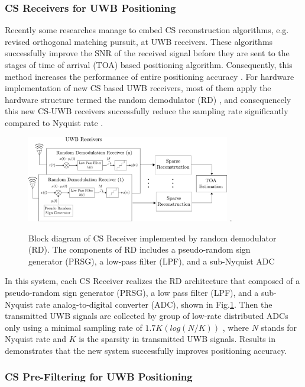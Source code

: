 \subsubsection{CS Receivers for UWB Positioning}

Recently some researches manage to embed CS reconstruction algorithms, e.g. revised orthogonal matching pursuit, at UWB receivers. These algorithms successfully improve the SNR of the received signal before they are sent to the stages of time of arrival (TOA) based positioning algorithm. Consequently, this method increases the performance of entire positioning accuracy \cite{banitalebi2014compressive}. For hardware implementation of new CS based UWB receivers, most of them apply the hardware structure termed the random demodulator (RD) \cite{kirolos2006analog}, and consequencely this new CS-UWB receivers successfully reduce the sampling rate significantly compared to Nyquist rate \cite{yang2011compressive}.

\begin{figure}[!t]
\centering
\includegraphics[width=3.5in]{pictures/cs-uwb-design1.pdf}
\DeclareGraphicsExtensions.
\caption{Block diagram of CS Receiver implemented by random demodulator (RD). The components of RD includes a pseudo-random sign generator (PRSG), a low-pass filter (LPF), and a sub-Nyquist ADC}
\label{cs-uwb-design1}
\end{figure}

In this system, each CS Receiver realizes the RD architecture that composed of a pseudo-random sign generator (PRSG), a low pass filter (LPF), and a sub-Nyquist rate analog-to-digital converter (ADC), shown in Fig.\ref{cs-uwb-design1}. Then the transmitted UWB signals are collected by group of low-rate distributed ADCs only using a minimal sampling rate of $1.7K(log(N/K))$ \cite{kirolos2006analog}, where $N$ stands for Nyquist rate and $K$ is the sparsity in transmitted UWB signals. Results in \cite{yang2013compressive} demonstrates that the new system successfully improves positioning accuracy. 

\subsubsection{CS Pre-Filtering for UWB Positioning}

